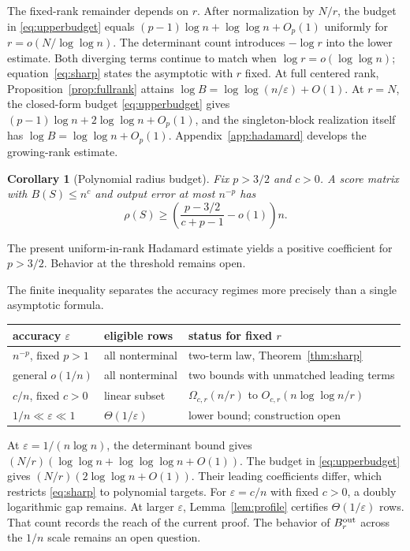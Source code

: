 \documentclass[10pt]{article}
\newtheorem{corollary}[theorem]{Corollary}
\theoremstyle{definition}
\begin{document}
The fixed-rank remainder depends on \(r\).  After normalization by \(N/r\),
the budget in \eqref{eq:upperbudget} equals
\((p-1)\log n+\log\log n+O_p(1)\) uniformly for
\(r=o(N/\log\log n)\).  The determinant count introduces \(-\log r\) into
the lower estimate.  Both diverging terms continue to match when
\(\log r=o(\log\log n)\); equation~\eqref{eq:sharp} states the asymptotic with
\(r\) fixed.  At full centered rank, Proposition~\ref{prop:fullrank} attains
\(\log B=\log\log(n/\varepsilon)+O(1)\).  At \(r=N\), the closed-form budget
\eqref{eq:upperbudget} gives
\((p-1)\log n+2\log\log n+O_p(1)\), and the singleton-block realization itself
has \(\log B=\log\log n+O_p(1)\).  Appendix~\ref{app:hadamard} develops the
growing-rank estimate.

\begin{corollary}[Polynomial radius budget]\label{cor:budget}
Fix \(p>3/2\) and \(c>0\).  A score matrix with \(B(S)\le n^c\) and output
error at most \(n^{-p}\) has
\[
 \rho(S)\ge
 \left(\frac{p-3/2}{c+p-1}-o(1)\right)n.
\]
\end{corollary}

The present uniform-in-rank Hadamard estimate yields a positive coefficient
for \(p>3/2\).  Behavior at the threshold remains open.

The finite inequality separates the accuracy regimes more precisely than a
single asymptotic formula.

\begin{center}
\begin{tabular}{lll}
\toprule
accuracy \(\varepsilon\) & eligible rows & status for fixed \(r\) \\
\midrule
\(n^{-p}\), fixed \(p>1\) & all nonterminal
 & two-term law, Theorem~\ref{thm:sharp} \\
general \(o(1/n)\) & all nonterminal
 & two bounds with unmatched leading terms \\
\(c/n\), fixed \(c>0\) & linear subset
 & \(\Omega_{c,r}(n/r)\) to \(O_{c,r}(n\log\log n/r)\) \\
\(1/n\ll\varepsilon\ll1\) & \(\Theta(1/\varepsilon)\)
 & lower bound; construction open \\
\bottomrule
\end{tabular}
\end{center}

At \(\varepsilon=1/(n\log n)\), the determinant bound gives
\((N/r)(\log\log n+\log\log\log n+O(1))\).  The budget in
\eqref{eq:upperbudget} gives \((N/r)(2\log\log n+O(1))\).  Their leading
coefficients differ, which restricts \eqref{eq:sharp} to polynomial targets.
For \(\varepsilon=c/n\) with fixed \(c>0\), a doubly logarithmic gap remains.
At larger \(\varepsilon\), Lemma~\ref{lem:profile} certifies
\(\Theta(1/\varepsilon)\) rows.  That count records the reach of the current
proof.  The behavior of \(B^{\rm out}_r\) across the \(1/n\) scale remains an
open question.
\end{document}
